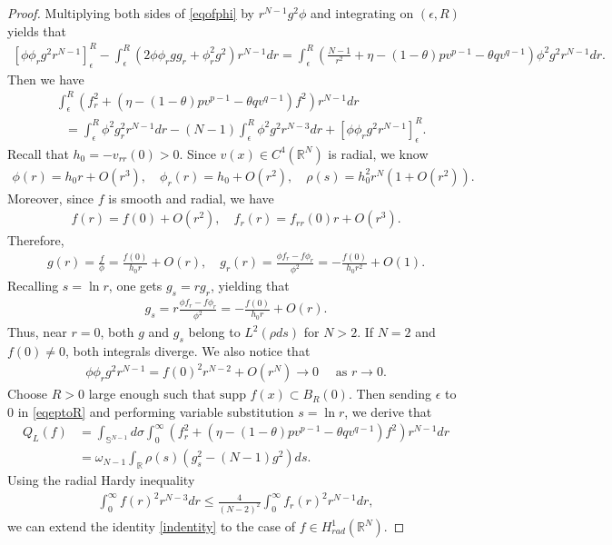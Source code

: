 \documentclass{article}
\theoremstyle{definition} \theoremstyle{remark}
\numberwithin{equation}{section}
\newcommand{\R}{\mathbb{R}}
\newcommand{\ep}{\epsilon}
\begin{document}
	\begin{proof}
		Multiplying both sides of \eqref{eqofphi} by $r^{N-1}g^2\phi$ and integrating on $(\ep,R)$ yields that
		\begin{align*}
			\left[\phi\phi_r g^2r^{N-1}\right]_{\ep}^R - \int_\ep^R \left(2\phi\phi_r gg_r + \phi_r^2 g^2\right)r^{N-1}dr = \int_\ep^R\left(\frac{N-1}{r^2} + \eta - (1-\theta)pv^{p-1} - \theta q v^{q-1}\right)\phi^2 g^2 r^{N-1}dr.
		\end{align*}
		Then we have
		\begin{align} \label{eqeptoR}
			& \int_\ep^R \left(f_r^2 + (\eta - (1-\theta)pv^{p-1} - \theta q v^{q-1})f^2\right)r^{N-1}dr \\
			& ~~~ = \int_\ep^R \phi^2g_r^2 r^{N-1}dr - (N-1)\int_\ep^R \phi^2g^2r^{N-3}dr + \left[\phi\phi_r g^2r^{N-1}\right]_{\ep}^R.
 		\end{align}
		Recall that $h_0 = -v_{rr}(0) > 0$. Since $v(x) \in C^4(\R^N)$ is radial, we know
		\begin{align*}
			\phi(r) = h_0r + O(r^3), \quad \phi_r(r) = h_0 + O(r^2), \quad \rho(s) = h_0^2r^{N}(1+O(r^2)).
		\end{align*}
		Moreover, since $f$ is smooth and radial, we have
		\begin{align*}
			f(r) = f(0) + O(r^2), \quad f_r(r) = f_{rr}(0)r + O(r^3).
		\end{align*}
		Therefore,
		\begin{align*}
			g(r) = \frac{f}{\phi} = \frac{f(0)}{h_0r} + O(r), \quad g_r(r) = \frac{\phi f_r - f\phi_r}{\phi^2} = -\frac{f(0)}{h_0r^2} + O(1).
		\end{align*}
		Recalling $s = \ln r$, one gets $g_s = rg_r$, yielding that
		\begin{align*}
			g_s = r\frac{\phi f_r - f\phi_r}{\phi^2} = -\frac{f(0)}{h_0r} + O(r).
		\end{align*}
		Thus, near $r = 0$, both $g$ and $g_s$ belong to $L^2(\rho ds)$ for $N > 2$. If $N = 2$ and $f(0) \neq 0$, both integrals diverge. We also notice that
		\begin{align*}
			\phi\phi_r g^2r^{N-1} = f(0)^2r^{N-2} + O(r^N) \to 0 \quad \text{ as } r \to 0.
		\end{align*}
		Choose $R > 0$ large enough such that $\text{supp~}f(x) \subset B_R(0)$. Then sending $\ep$ to $0$ in \eqref{eqeptoR} and performing variable substitution $s = \ln r$, we derive that
		\begin{align*}
			Q_L(f) & = \int_{\mathbb{S}^{N-1}}d\sigma \int_0^\infty\left(f_r^2 + (\eta - (1-\theta)pv^{p-1} - \theta q v^{q-1})f^2\right)r^{N-1}dr \\
			& = \omega_{N-1} \int_{\R} \rho(s)\left(g_s^2 - (N-1)g^2\right)ds.
		\end{align*}
Using the radial Hardy inequality
		\begin{align*}
			\int_0^\infty f(r)^2r^{N-3}dr \le \frac{4}{(N-2)^2}\int_0^\infty f_r(r)^2r^{N-1}dr,
		\end{align*}
		we can extend the identity \eqref{indentity} to the case of $f \in H^1_{rad}(\R^N)$.
	\end{proof}
\end{document}
